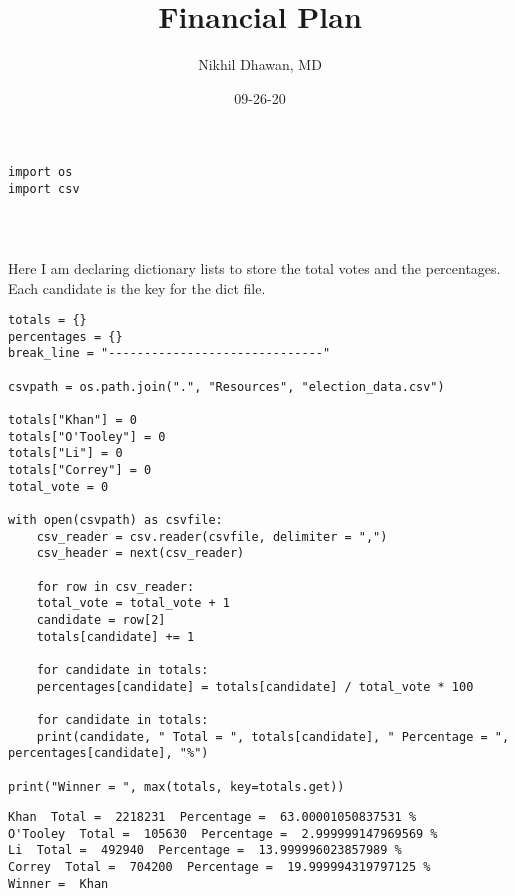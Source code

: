 \documentclass[11pt]{article}
\author{Nikhil Dhawan, MD}
\date{09-26-20}
\title{Financial Plan}
\begin{document}
\maketitle
\tableofcontents

\begin{verbatim}
import os
import csv
\end{verbatim}

\begin{verbatim}



\end{verbatim}


Here I am declaring dictionary lists to store the total votes and the percentages. Each candidate is the key for the dict file. 

\begin{verbatim}
totals = {}
percentages = {}
break_line = "------------------------------"

csvpath = os.path.join(".", "Resources", "election_data.csv")  

totals["Khan"] = 0
totals["O'Tooley"] = 0
totals["Li"] = 0
totals["Correy"] = 0
total_vote = 0

with open(csvpath) as csvfile:
    csv_reader = csv.reader(csvfile, delimiter = ",")
    csv_header = next(csv_reader)

    for row in csv_reader:
	total_vote = total_vote + 1
	candidate = row[2]
	totals[candidate] += 1

    for candidate in totals:
	percentages[candidate] = totals[candidate] / total_vote * 100

    for candidate in totals:
	print(candidate, " Total = ", totals[candidate], " Percentage = ", percentages[candidate], "%")

print("Winner = ", max(totals, key=totals.get))
\end{verbatim}

\begin{verbatim}
Khan  Total =  2218231  Percentage =  63.00001050837531 %
O'Tooley  Total =  105630  Percentage =  2.999999147969569 %
Li  Total =  492940  Percentage =  13.999996023857989 %
Correy  Total =  704200  Percentage =  19.999994319797125 %
Winner =  Khan


\end{verbatim}
\end{document}
